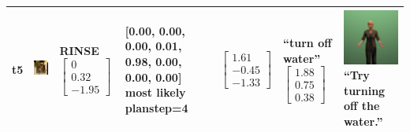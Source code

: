 \begin{longtable}{| V{0.8cm} | V{2.6cm} | V{1.6cm} | V{2.1cm} | V{1.55cm} | V{1.6cm} | V{3.2cm} |}
t5 &
\includegraphics[width=\linewidth]{fig/system/_slow2-rinse2-2_.jpg} &
RINSE
\linebreak\linebreak
$\begin{bmatrix}
0 \\
0.32 \\
-1.95
\end{bmatrix}$ &
[0.00, 0.00, 0.00, 0.01, 0.98, 0.00, 0.00, 0.00] most likely planstep=4 &
$\begin{bmatrix}
1.61 \\
-0.45 \\
-1.33
\end{bmatrix}$ &
``turn off water''
\linebreak\linebreak
$\begin{bmatrix}
1.88 \\
0.75 \\
0.38
\end{bmatrix}$ &
\includegraphics[width=2.6cm]{fig/prompt/_try-turning-off-the-water_.jpg}
\linebreak
\footnotesize
``Try turning off the water.''
\\ \hline




\end{longtable}
